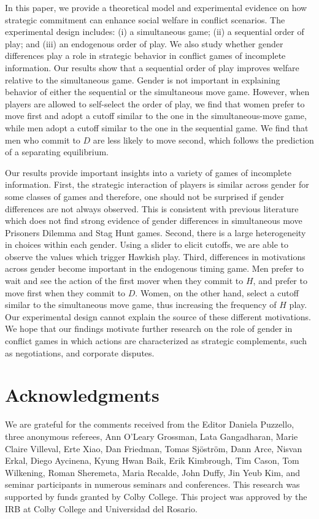 \documentclass[12pt, letterpaper]{article}
\theoremstyle{plain}
\begin{document}
In this paper, we provide a theoretical model and experimental evidence on how strategic commitment can enhance social welfare in conflict scenarios. The experimental design includes: (i) a simultaneous game; (ii) a sequential order of play; and (iii) an endogenous order of play. We also study whether gender differences play a role in strategic behavior in conflict games of incomplete information. Our results show that a sequential order of play improves welfare relative to the simultaneous game. Gender is not important in explaining behavior of either the sequential or the simultaneous move game. However, when players are allowed to self-select the order of play, we find that women prefer to move first and adopt a cutoff similar to the one in the simultaneous-move game, while men adopt a cutoff similar to the one in the sequential game. We find that men who commit to $D$ are less likely to move second, which follows the prediction of a separating equilibrium. 

Our results provide important insights into a variety of games of incomplete information. First, the strategic interaction of players is similar across gender for some classes of games and therefore, one should not be surprised if gender differences are not always observed. This is consistent with previous literature which does not find strong evidence of gender differences in simultaneous move Prisoners Dilemma and Stag Hunt games. Second, there is a large heterogeneity in choices within each gender. Using a slider to elicit cutoffs, we are able to observe the values which trigger Hawkish play. Third, differences in motivations across gender become important in the endogenous timing game. Men prefer to wait and see the action of the first mover when they commit to $H$, and prefer to move first when they commit to $D$. Women, on the other hand, select a cutoff similar to the simultaneous move game, thus increasing the frequency of $H$ play. Our experimental design cannot explain the source of these different motivations. We hope that our findings motivate further research on the role of gender in conflict games in which actions are characterized as strategic complements, such as negotiations, and corporate disputes.


\section{Acknowledgments}
We are grateful for the comments received from the Editor Daniela Puzzello, three anonymous referees, Ann O'Leary Grossman, Lata Gangadharan, Marie Claire Villeval, Erte Xiao, Dan Friedman, Tomas Sj\"ostr\"om, Dann Arce, Nisvan Erkal, Diego Aycinena, Kyung Hwan Baik, Erik Kimbrough, Tim Cason, Tom Wilkening, Roman Sheremeta, Maria Recalde, John Duffy, Jin Yeub Kim, and seminar participants in numerous seminars and conferences. This research was supported by funds granted by Colby College. This project was approved by the IRB at Colby College and Universidad del Rosario.
\end{document}
